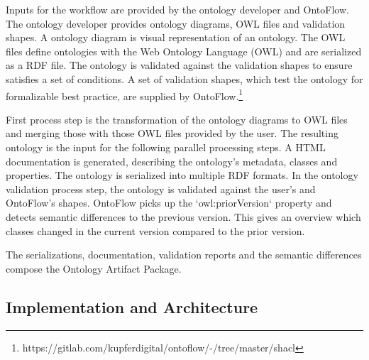 \documentclass[sigconf]{acmart}
\begin{document}
Inputs for the workflow are provided by the ontology developer and OntoFlow.
The ontology developer provides ontology diagrams, OWL files and validation shapes.
A ontology diagram is visual representation of an ontology.
The OWL files define ontologies with the Web Ontology Language (OWL) and are serialized as a RDF file.
The ontology is validated against the validation shapes to ensure satisfies a set of conditions.
A set of validation shapes, which test the ontology for formalizable best practice, are supplied by OntoFlow.\footnote{https://gitlab.com/kupferdigital/ontoflow/-/tree/master/shacl}

First process step is the transformation of the ontology diagrams to OWL files and merging those with those OWL files provided by the user.
The resulting ontology is the input for the following parallel processing steps.
A HTML documentation is generated, describing the ontology's metadata, classes and properties.
The ontology is serialized into multiple RDF formats.
In the ontology validation process step, the ontology is validated against the user's and OntoFlow's shapes.
OntoFlow picks up the `owl:priorVersion` property and detects semantic differences to the previous version. This gives an overview which classes changed in the current version compared to the prior version.

The serializations, documentation, validation reports and the semantic differences compose the Ontology Artifact Package.

\subsection{Implementation and Architecture}
\end{document}
